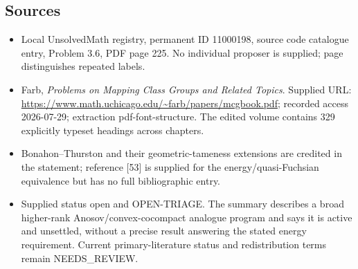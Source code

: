 \documentclass[11pt]{article}
\begin{document}
\subsection{Sources}
\begin{itemize}
\item Local UnsolvedMath registry, permanent ID 11000198, source code catalogue entry, Problem 3.6, PDF page 225. No individual proposer is supplied; page distinguishes repeated labels.
\item Farb, \emph{Problems on Mapping Class Groups and Related Topics}. Supplied URL: \url{https://www.math.uchicago.edu/~farb/papers/mcgbook.pdf}; recorded access 2026-07-29; extraction pdf-font-structure. The edited volume contains 329 explicitly typeset headings across chapters.
\item Bonahon--Thurston and their geometric-tameness extensions are credited in the statement; reference [53] is supplied for the energy/quasi-Fuchsian equivalence but has no full bibliographic entry.
\item Supplied status open and OPEN-TRIAGE. The summary describes a broad higher-rank Anosov/convex-cocompact analogue program and says it is active and unsettled, without a precise result answering the stated energy requirement. Current primary-literature status and redistribution terms remain NEEDS\_REVIEW.
\end{itemize}
\end{document}
